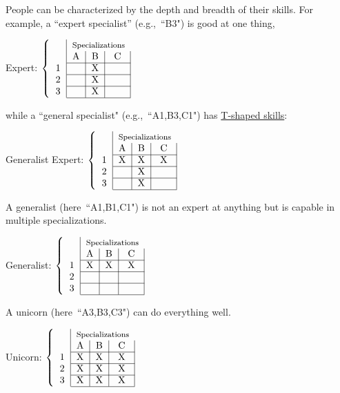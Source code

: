 People can be characterized by the depth and breadth of their skills. For example, a ``expert specialist'' (e.g.,~``B3") is good at one thing, 
\begin{center}
Expert:
$\left\{
\begin{tabular}{c|c|c|c|}
&\multicolumn{3}{c}{\footnotesize Specializations}\\
& A & B & C \\
\cline{2-4}
1 & &  X &  \\
\cline{2-4}
2 & & X & \\
\cline{2-4}
3 & & X & \\
\cline{2-4}
\end{tabular}
\right.$
\end{center}
while a ``general specialist" (e.g.,~``A1,B3,C1") has \href{https://en.wikipedia.org/wiki/T-shaped_skills}{T-shaped skills}:
\begin{center}
Generalist Expert:
$\left\{
\begin{tabular}{c|c|c|c|}
& \multicolumn{3}{c}{\footnotesize Specializations}\\
& A & B & C \\
\cline{2-4}
1 & X &  X & X \\
\cline{2-4}
2 & & X & \\
\cline{2-4}
3 & & X & \\
\cline{2-4}
\end{tabular}
\right.$
\end{center}

A generalist (here~``A1,B1,C1") is not an expert at anything but is capable in multiple specializations. 
\begin{center}
Generalist:
$\left\{
\begin{tabular}{c|c|c|c|}
 & \multicolumn{3}{c}{\footnotesize Specializations}\\
& A & B & C \\
\cline{2-4}
1 & X &  X & X \\
\cline{2-4}
 2 & &  & \\
\cline{2-4}
3 &  &  & \\
\cline{2-4}
\end{tabular}
\right.$
\end{center}

A unicorn (here~``A3,B3,C3") can do everything well.
\begin{center}
Unicorn:
$\left\{
\begin{tabular}{c|c|c|c|}
& \multicolumn{3}{c}{\footnotesize Specializations}\\
   & A & B & C \\
\cline{2-4}
 1 & X & X & X \\
\cline{2-4}
 2 & X & X & X \\
\cline{2-4}
 3 & X & X & X \\
\cline{2-4}
\end{tabular}
\right.$
\end{center}


